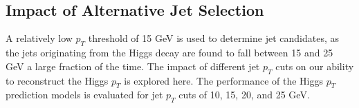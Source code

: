 \begin{figure}[H]
  \\                                
  \caption{}
  \label{fig:bin3lSroc}
\end{figure} 

\begin{figure}[H]
  \\                                
  \caption{}
  \label{fig:bin3lFroc}
\end{figure} 

\subsection{Impact of Alternative Jet Selection}
\label{subsec:ptCutApx}

A relatively low $p_T$ threshold of 15 GeV is used to determine jet candidates, as the jets originating from the Higgs decay are found to fall between 15 and 25 GeV a large fraction of the time. The impact of different jet $p_T$ cuts on our ability to reconstruct the Higgs $p_T$ is explored here. The performance of the Higgs $p_T$ prediction models is evaluated for jet $p_T$ cuts of 10, 15, 20, and 25 GeV.

\begin{figure}[H]
    \\           
    \\                       
    \caption{}
    \label{fig:pt2lSS_20}
\end{figure} 

